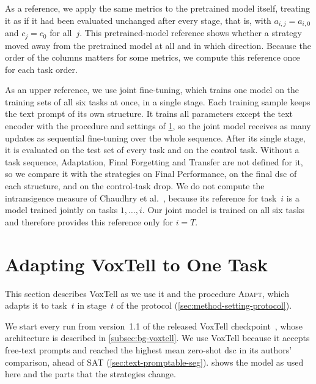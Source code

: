 As a reference, we apply the same metrics to the pretrained model itself, treating it as if it had been evaluated unchanged after every stage, that is, with $a_{i,j} = a_{i,0}$ and $c_j = c_0$ for all~$j$.
This pretrained-model reference shows whether a strategy moved away from the pretrained model at all and in which direction.
Because the order of the columns matters for some metrics, we compute this reference once for each task order.

As an upper reference, we use joint fine-tuning, which trains one model on the training sets of all six tasks at once, in a single stage.
Each training sample keeps the text prompt of its own structure.
It trains all parameters except the text encoder with the procedure and settings of \cref{sec:method-adaptation}, so the joint model receives as many updates as sequential fine-tuning over the whole sequence.
After its single stage, it is evaluated on the test set of every task and on the control task.
Without a task sequence, Adaptation, Final Forgetting and Transfer are not defined for it, so we compare it with the strategies on Final Performance, on the final \gls{dsc} of each structure, and on the control-task drop.
We do not compute the intransigence measure of Chaudhry et al.~\cite{Chaudhry_2018}, because its reference for task~$i$ is a model trained jointly on tasks $1, \dots, i$.
Our joint model is trained on all six tasks and therefore provides this reference only for $i = T$.

\section{Adapting VoxTell to One Task}
\label{sec:method-adaptation}

This section describes VoxTell as we use it and the procedure \textsc{Adapt}, which adapts it to task~$t$ in stage~$t$ of the protocol (\cref{sec:method-setting-protocol}).

We start every run from version~1.1 of the released VoxTell checkpoint~\cite{rokuss2025voxtellfreetextpromptableuniversal}, whose architecture is described in \cref{subsec:bg-voxtell}.
We use VoxTell because it accepts free-text prompts and reached the highest mean zero-shot \gls{dsc} in its authors' comparison, ahead of SAT (\cref{sec:text-promptable-seg}).
 shows the model as used here and the parts that the strategies change.

